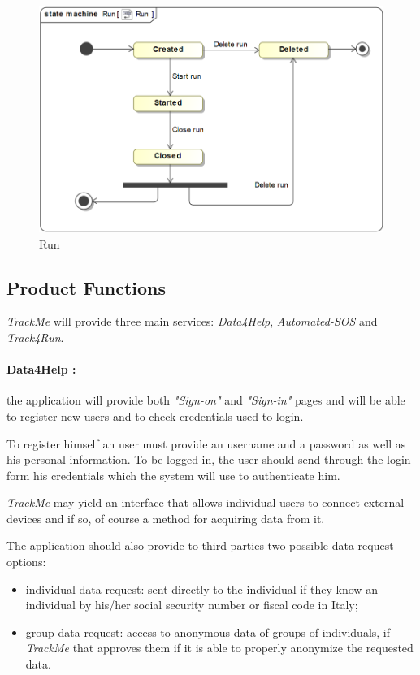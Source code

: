 \documentclass[a4paper]{article}
\begin{document}
    \begin{figure}[!ht]
        \centering
        \includegraphics[width=\textwidth, keepaspectratio]{images/UML/state_run.png}
        \caption{Run}
        \label{fig:state_run}
    \end{figure}
    \newpage
    \subsection{Product Functions}
    \textit{TrackMe} will provide three main services: \textit{Data4Help}, \textit{Automated-SOS} and \textit{Track4Run}.
    
    \paragraph{Data4Help :}
    the application will provide both \textit{"Sign-on"} and \textit{"Sign-in"} pages and will be able to register new users and to check credentials used to login.
    
    To register himself an user must provide an username and a password as well as his personal information. To be logged in, the user should send through the login form his credentials which the system will use to authenticate him.
    
    \textit{TrackMe} may yield an interface that allows individual users to connect external devices and if so, of course a method for acquiring data from it.
    
    The application should also provide to third-parties two possible data request options:
    \begin{itemize}
        \item individual data request: sent directly to the individual if they know an  individual by his/her social security number or fiscal code in Italy;
        \item group data request: access  to  anonymous  data  of  groups  of  individuals, if \textit{TrackMe}  that  approves  them  if  it  is  able  to  properly  anonymize  the  requested  data.
    \end{itemize}
    
\end{document}
